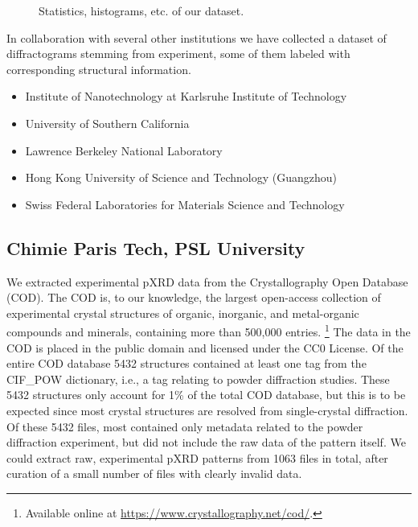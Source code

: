 



\begin{figure*}[!ht]
    \centering
    \missingfigure{} 
    \caption{Statistics, histograms, etc. of our dataset.}
    \label{fig:statistics}
\end{figure*}

In collaboration with several other institutions we have collected a dataset of diffractograms stemming from experiment, some of them labeled with corresponding structural information. 

\begin{itemize}
    \item Institute of Nanotechnology at Karlsruhe Institute of Technology
    \item University of Southern California
    \item Lawrence Berkeley National Laboratory
    \item Hong Kong University of Science and Technology (Guangzhou)
    \item Swiss Federal Laboratories for Materials Science and Technology
\end{itemize}

\subsection*{Chimie Paris Tech, PSL University}

We extracted experimental pXRD data from the Crystallography Open Database (COD).\cite{Grazulis2009, Vaitkus2023} The COD is, to our knowledge, the largest open-access collection of experimental crystal structures of organic, inorganic, and metal-organic compounds and minerals, containing more than 500,000 entries. \footnote{Available online at \url{https://www.crystallography.net/cod/}.} The data in the COD is placed in the public domain and licensed under the CC0 License. Of the entire COD database 5432 structures contained at least one tag from the {CIF\_POW} dictionary, i.e., a tag relating to powder diffraction studies. These 5432 structures only account for 1\% of the total COD database, but this is to be expected since most crystal structures are resolved from single-crystal diffraction. Of these 5432 files, most contained only metadata related to the powder diffraction experiment, but did not include the raw data of the pattern itself. We could extract raw, experimental pXRD patterns from 1063 files in total, after curation of a small number of files with clearly invalid data. \\

